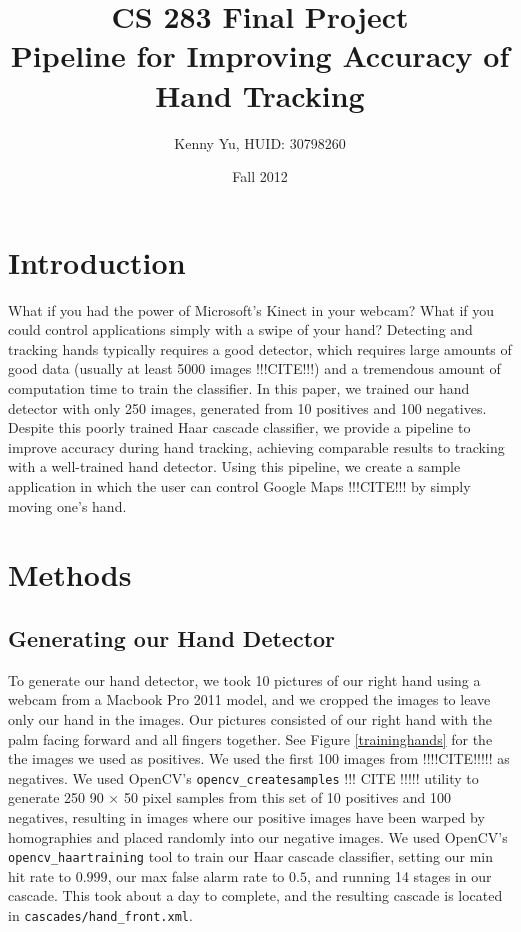 \documentclass[12pt]{article}
\begin{document}
\title{CS 283 Final Project \\ Pipeline for Improving Accuracy of Hand Tracking}
\date{Fall 2012}
\author{Kenny Yu, HUID: 30798260}
\maketitle

\section{Introduction}
What if you had the power of Microsoft's Kinect in your webcam? What if you could control applications simply with a swipe of your hand? Detecting and tracking hands typically requires a good detector, which requires large amounts of good data (usually at least 5000 images !!!CITE!!!) and a tremendous amount of computation time to train the classifier. In this paper, we trained our hand detector with only 250 images, generated from 10 positives and 100 negatives. Despite this poorly trained Haar cascade classifier, we provide a pipeline to improve accuracy during hand tracking, achieving comparable results to tracking with a well-trained hand detector. Using this pipeline, we create a sample application in which the user can control Google Maps !!!CITE!!! by simply moving one's hand.

\section{Methods}
\subsection{Generating our Hand Detector}

To generate our hand detector, we took 10 pictures of our right hand using a webcam from a  Macbook Pro 2011 model, and we cropped the images to leave only our hand in the images. Our pictures consisted of our right hand with the palm facing forward and all fingers together. See Figure \ref{traininghands} for the the images we used as positives. We used the first 100 images from !!!!CITE!!!!! as negatives. We used OpenCV's \texttt{opencv\_createsamples} !!! CITE !!!!! utility to generate 250 90 $\times$ 50 pixel samples from this set of 10 positives and 100 negatives, resulting in images where our positive images have been warped by homographies and placed randomly into our negative images. We used OpenCV's \texttt{opencv\_haartraining} tool to train our Haar cascade classifier, setting our min hit rate to $0.999$, our max false alarm rate to $0.5$, and running 14 stages in our cascade. This took about a day to complete, and the resulting cascade is located in \texttt{cascades/hand\_front.xml}.
\end{document}
